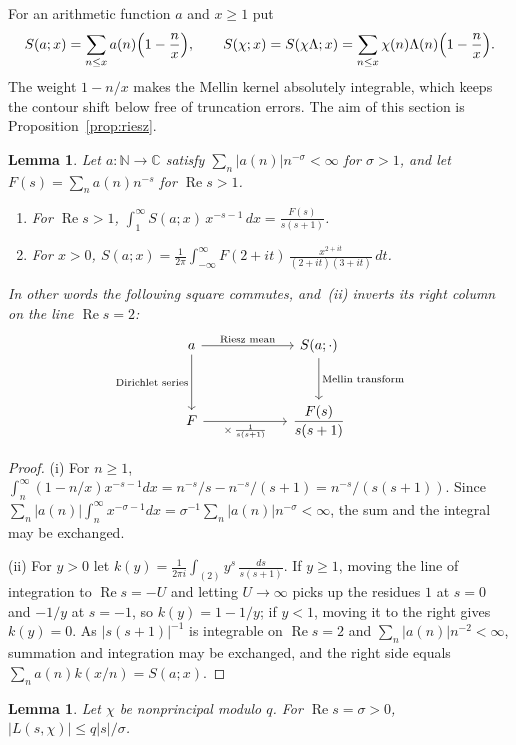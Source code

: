 \documentclass[12pt]{amsart}
\numberwithin{equation}{section}
\newtheorem{lemma}[theorem]{Lemma}
\theoremstyle{definition}
\renewcommand{\Re}{\operatorname{Re}}
\newcommand{\C}{\mathbb{C}}
\begin{document}
For an arithmetic function $a$ and $x\ge1$ put
\[
  S(a;x)=\sum_{n\le x}a(n)\Bigl(1-\frac nx\Bigr),\qquad
  S(\chi;x)=S(\chi\Lambda;x)=\sum_{n\le x}\chi(n)\Lambda(n)\Bigl(1-\frac nx\Bigr).
\]
The weight $1-n/x$ makes the Mellin kernel absolutely integrable, which keeps the contour shift
below free of truncation errors. The aim of this section is Proposition~\ref{prop:riesz}.

\begin{lemma}\label{lem:mellin}
Let $a\colon\mathbb N\to\C$ satisfy $\sum_n|a(n)|n^{-\sigma}<\infty$ for $\sigma>1$, and let
$F(s)=\sum_na(n)n^{-s}$ for $\Re s>1$.
\begin{enumerate}
\item[(i)] For $\Re s>1$, $\displaystyle\int_1^\infty S(a;x)\,x^{-s-1}\,dx=\frac{F(s)}{s(s+1)}$.
\item[(ii)] For $x>0$, $\displaystyle S(a;x)=\frac1{2\pi}\int_{-\infty}^{\infty}
F(2+it)\,\frac{x^{2+it}}{(2+it)(3+it)}\,dt$.
\end{enumerate}
In other words the following square commutes, and~(ii) inverts its right column on the line
$\Re s=2$:
\[
\begin{tikzcd}[column sep=6em,row sep=3em]
a \arrow[r,"\text{Riesz mean}"] \arrow[d,"\text{Dirichlet series}"'] &
S(a;\cdot) \arrow[d,"\text{Mellin transform}"] \\
F \arrow[r,"\times\,\frac1{s(s+1)}"'] & \dfrac{F(s)}{s(s+1)}
\end{tikzcd}
\]
\end{lemma}

\begin{proof}
(i) For $n\ge1$, $\int_n^\infty(1-n/x)x^{-s-1}dx=n^{-s}/s-n^{-s}/(s+1)=n^{-s}/(s(s+1))$. Since
$\sum_n|a(n)|\int_n^\infty x^{-\sigma-1}dx=\sigma^{-1}\sum_n|a(n)|n^{-\sigma}<\infty$, the sum
and the integral may be exchanged.

(ii) For $y>0$ let $k(y)=\frac1{2\pi i}\int_{(2)}y^s\,\frac{ds}{s(s+1)}$. If $y\ge1$, moving the
line of integration to $\Re s=-U$ and letting $U\to\infty$ picks up the residues $1$ at $s=0$ and
$-1/y$ at $s=-1$, so $k(y)=1-1/y$; if $y<1$, moving it to the right gives $k(y)=0$. As
$|s(s+1)|^{-1}$ is integrable on $\Re s=2$ and $\sum_n|a(n)|n^{-2}<\infty$, summation and
integration may be exchanged, and the right side equals $\sum_na(n)k(x/n)=S(a;x)$.
\end{proof}

\begin{lemma}\label{lem:size}
Let $\chi$ be nonprincipal modulo $q$. For $\Re s=\sigma>0$, $|L(s,\chi)|\le q|s|/\sigma$.
\end{lemma}
\end{document}

